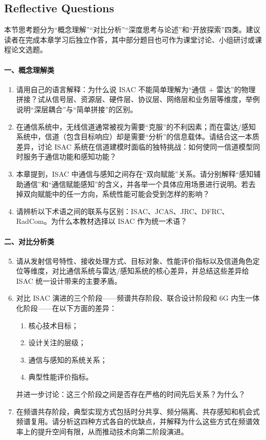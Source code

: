 \subsection{Reflective Questions}
\label{subsec:ch1.1-reflect-questions}

本节思考题分为“概念理解”“对比分析”“深度思考与论述”和“开放探索”四类。建议读者在完成本章学习后独立作答，其中部分题目也可作为课堂讨论、小组研讨或课程论文选题。

\paragraph{一、概念理解类}
\begin{enumerate}
    \item 请用自己的语言解释：为什么说 ISAC 不能简单理解为“通信 + 雷达”的物理拼接？试从信号层、资源层、硬件层、协议层、网络层和业务层等维度，举例说明“深层耦合”与“简单拼接”的区别。

    \item 在通信系统中，无线信道通常被视为需要“克服”的不利因素；而在雷达/感知系统中，信道（包含目标响应）却是需要“分析”的信息载体。请结合这一本质差异，讨论 ISAC 系统在信道建模时面临的独特挑战：如何使同一信道模型同时服务于通信功能和感知功能？

    \item 本章提到，ISAC 中通信与感知之间存在“双向赋能”关系。请分别解释“感知辅助通信”和“通信赋能感知”的含义，并各举一个具体应用场景进行说明。若去掉双向赋能中的任一方向，系统性能可能会受到怎样的影响？

    \item 请辨析以下术语之间的联系与区别：ISAC、JCAS、JRC、DFRC、RadCom。为什么本教材选择以 ISAC 作为统一术语？
\end{enumerate}

\paragraph{二、对比分析类}
\begin{enumerate}
    \setcounter{enumi}{4}
    \item 请从发射信号特性、接收处理方式、目标对象、性能评价指标以及信道角色定位等维度，对比通信系统与雷达/感知系统的核心差异，并总结这些差异给 ISAC 统一设计带来的主要矛盾。

    \item 对比 ISAC 演进的三个阶段——频谱共存阶段、联合设计阶段和 6G 内生一体化阶段——在以下方面的差异：
    \begin{enumerate}
        \item 核心技术目标；
        \item 设计关注的层级；
        \item 通信与感知的系统关系；
        \item 典型性能评价指标。
    \end{enumerate}
    并进一步讨论：这三个阶段之间是否存在严格的时间先后关系？为什么？

    \item 在频谱共存阶段，典型实现方式包括时分共享、频分隔离、共存感知和机会式频谱复用。请分析这四种方式各自的优缺点，并解释为什么这些方式在频谱效率上的提升空间有限，从而推动技术向第二阶段演进。
\end{enumerate}

